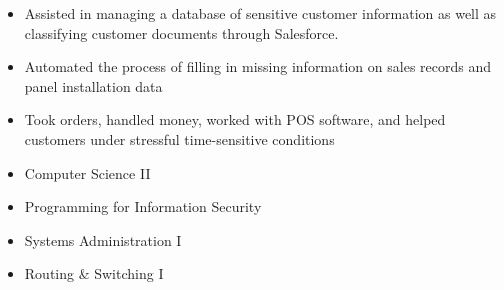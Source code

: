 

\begin{itemize}
\item Assisted in managing a database of sensitive customer information as well as classifying customer documents through Salesforce.
\smallskip
\item Automated the process of filling in missing information on sales records and panel installation data 
\end{itemize}

\divider

\begin{itemize}
\item Took orders, handled money, worked with POS software, and helped customers under stressful time-sensitive conditions
\end{itemize}

\smallskip
\smallskip
{}
\smallskip
\begin{itemize}
\item Computer Science II
\smallskip
\item Programming for Information Security
\smallskip
\item Systems Administration I
\smallskip
\item Routing \& Switching I
\end{itemize}

